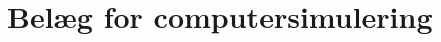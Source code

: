 



\maketitle

\tableofcontents


\thispagestyle{empty}

\clearpage
\section{Belæg for computersimulering}










\renewcommand{\appendixtocname}{Bilag}
\renewcommand{\appendixpagename}{Bilag}

